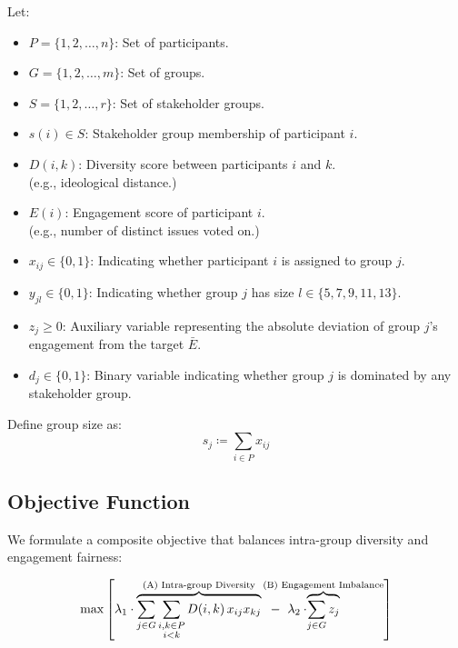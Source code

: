 Let:
\begin{itemize}
    \item $P = \{1, 2, \dots, n\}$: Set of participants.
    \item $G = \{1, 2, \dots, m\}$: Set of groups.
    \item $S = \{1, 2, \dots, r\}$: Set of stakeholder groups.
    \item $s(i) \in S$: Stakeholder group membership of participant $i$.
    \item $D(i,k)$: Diversity score between participants $i$ and $k$.\\(e.g., ideological distance.)
    \item $E(i)$: Engagement score of participant $i$.\\(e.g., number of distinct issues voted on.)
    \item $x_{ij} \in \{0,1\}$: Indicating whether participant $i$ is assigned to group $j$.
    \item $y_{jl} \in \{0,1\}$: Indicating whether group $j$ has size $l \in \{5,7,9,11,13\}$.
    \item $z_j \geq 0$: Auxiliary variable representing the absolute deviation of group $j$’s engagement from the target $\bar{E}$.
    \item $d_j \in \{0,1\}$: Binary variable indicating whether group $j$ is dominated by any stakeholder group.
\end{itemize}

Define group size as:
\[
s_j \coloneqq \sum_{i \in P} x_{ij}
\]

\subsection*{Objective Function}

We formulate a composite objective that balances intra-group diversity and engagement fairness:

\[
\max \left[
\lambda_1 \cdot \overbrace{
\sum_{j \in G} \sum_{\substack{i,k \in P \\ i < k}} D(i,k)\,x_{ij} x_{kj}
  }^{\text{(A) Intra-group Diversity}}
\hspace{0.2cm} - \hspace{0.2cm} \lambda_2 \cdot \hspace{-1.3cm} \overbrace{
\sum_{j \in G} z_j
}^{\text{(B) Engagement Imbalance}}
\right]
\]


